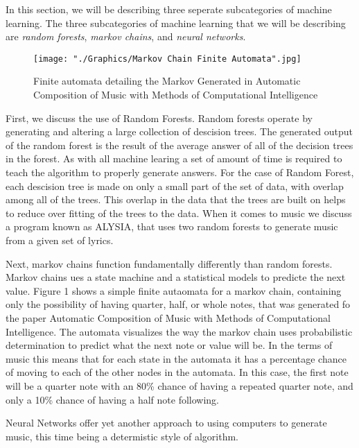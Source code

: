 \documentclass{sig-alternate}
\begin{document}
	In this section, we will be describing three seperate subcategories of machine learning. The three subcategories of machine learning that we will be describing are \textit{random forests},\textit{ markov chains}, and \textit{neural networks}. 



\begin{figure}[H]
	\texttt{[image: "./Graphics/Markov Chain Finite Automata".jpg]}
	\caption{Finite automata detailing the Markov Generated in Automatic Composition of Music with Methods of Computational Intelligence}
	\label{fig:markovchain1}
\end{figure}
	First, we discuss the use of Random Forests. Random forests operate by generating and altering a large collection of descision trees. The generated output of the random forest is the result of the average answer of all of the decision trees in the forest. As with all machine learing a set of amount of time is required to teach the algorithm to properly generate answers. For the case of Random Forest, each descision tree is made on only a small part of the set of data, with overlap among all of the trees. This overlap in the data that the trees are built on helps to reduce over fitting of the trees to the data. When it comes to music we discuss a program known as ALYSIA, that uses two random forests to generate music  from a given set of lyrics.
	
	Next, markov chains function  fundamentally differently than random forests. Markov chains ues a state machine and a statistical models to predicte the next value. Figure 1 shows a simple finite autaomata for a markov chain, containing only the possibility of having quarter, half, or whole notes, that was generated fo the paper Automatic Composition of Music with Methods of Computational Intelligence. The automata visualizes the way the markov chain uses probabilistic determination to predict what the next note or value will be. In the terms of music this means that for each state in the automata it has a percentage chance of moving to each of the other nodes in the automata. In this case,  the first note will be a quarter note with an 80\% chance of having a repeated quarter note, and only a 10\% chance of having a half note following. 

	Neural Networks offer yet another approach to using computers to generate music, this time being a determistic style of algorithm.  
\end{document}
